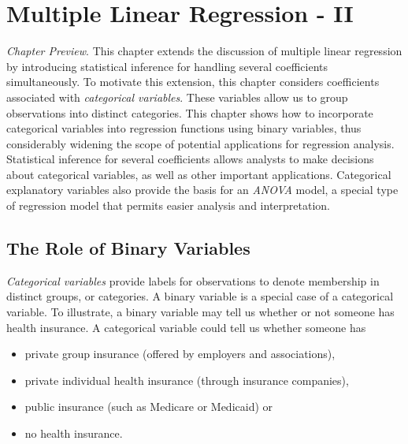 \setcounter{chapter}{3}
\chapter{Multiple Linear Regression - II}


{\small \textit{Chapter Preview}. This chapter extends the
discussion of multiple linear regression by introducing statistical
inference for handling several coefficients simultaneously. To
motivate this extension, this chapter considers coefficients
associated with \textit{categorical variables}. These variables
allow us to group observations into distinct categories. This
chapter shows how to incorporate categorical variables into
regression functions using binary variables, thus considerably
widening the scope of potential applications for regression
analysis. Statistical inference for several coefficients allows
analysts to make decisions about categorical variables, as well as
other important applications. Categorical explanatory variables also
provide the basis for an \textit{ANOVA} model, a special type of
regression model that permits easier analysis and interpretation.}

\section{The Role of Binary Variables}\label{S4:BinaryVar}



\textit{Categorical variables} provide labels for observations to
denote membership in distinct groups, or categories. A binary
variable is a special case of a categorical variable. To illustrate,
a binary variable may tell us whether or not someone has health
insurance. A categorical variable could tell us whether someone has
\begin{itemize}
\item private group insurance (offered by employers and
associations), \item private individual health insurance (through
insurance companies), \item public insurance (such as Medicare or
Medicaid) or \item no health insurance.
\end{itemize}

